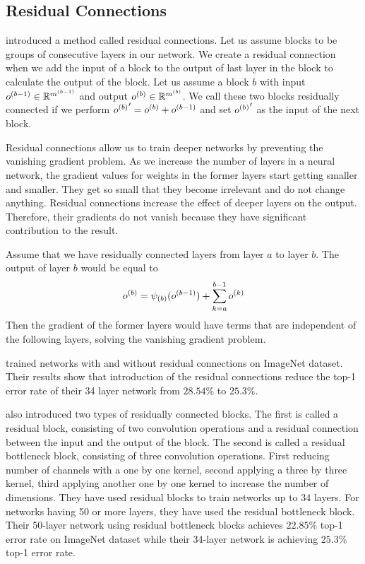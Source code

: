\subsection{Residual Connections}
\cite{He:2015aa} introduced a method called residual connections. Let us assume blocks to be groups of consecutive layers in our network. We create a residual connection when we add the input of a block to the output of last layer in the block to calculate the output of the block. Let us assume a block $b$ with input $o^{(b-1)} \in \mathbb{R}^{m^{(b-1)}}$ and output  $o^{(b)} \in \mathbb{R}^{m^{(b)}}$. We call these two blocks residually connected if we perform ${o^{(b)}}' = o^{(b)} + o^{(b-1)}$ and set ${o^{(b)}}'$ as the input of the next block. 

Residual connections allow us to train deeper networks by preventing the vanishing gradient problem. As we increase the number of layers in a neural network, the gradient values for weights in the former layers start getting smaller and smaller. They get so small that they become irrelevant and do not change anything. Residual connections increase the effect of deeper layers on the output. Therefore, their gradients do not vanish because they have significant contribution to the result.

Assume that we have residually connected layers from layer $a$ to layer $b$. The output of layer $b$ would be equal to
$$ o^{(b)} = \psi_{(b)}(o^{(b-1)}) + \sum_{k=a}^{b-1} o^{(k)} $$
Then the gradient of the former layers would have terms that are independent of the following layers, solving the vanishing gradient problem.

\cite{He:2015aa} trained networks with and without residual connections on ImageNet dataset. Their results show that introduction of the residual connections reduce the top-1 error rate of their 34 layer network from $28.54\%$ to $25.3\%$.

\cite{He:2015aa} also introduced two types of residually connected blocks. The first is called a residual block, consisting of two convolution operations and a residual connection between the input and the output of the block. The second is called a residual bottleneck block, consisting of three convolution operations. First reducing number of channels with a one by one kernel, second applying a three by three kernel, third applying another one by one kernel to increase the number of dimensions. They have used residual blocks to train networks up to 34 layers. For networks having 50 or more layers, they have used the residual bottleneck block. Their 50-layer network using residual bottleneck blocks achieves $22.85\%$ top-1 error rate on ImageNet dataset while their 34-layer network is achieving $25.3\%$ top-1 error rate.


